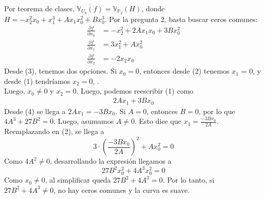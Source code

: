\begin{sol}
	Por teorema de clases, $\overline{\mathbb{V}_{U_0} (f)} = \mathbb{V}_{\mathbb{P}_2} (H)$, donde $H = -x_2^2x_0 + x_1^3 + Ax_1x_0^2 + Bx_0^3$. Por la pregunta 2, basta buscar ceros comunes: \begin{align}
		\frac{\partial f}{\partial x_0} & = -x_2^2 + 2Ax_1x_0 + 3Bx_0^2 \\
		\frac{\partial f}{\partial x_1} & = 3x_1^2 + Ax_0^2             \\
		\frac{\partial f}{\partial x_2} & = -2x_2x_0
	\end{align}
	Desde (3), tenemos dos opciones. Si $x_0 = 0$, entonces desde (2) tenemos $x_1$ = 0, y desde (1) tendríamos $x_2 = 0$, \nope. \\
	Luego, $x_0 \not= 0$ y $x_2 = 0$. Luego, podemos reescribir (1) como \begin{align}
		2Ax_1 + 3Bx_0
	\end{align}
	Desde (4) se llega a $2Ax_1 = -3Bx_0$. Si $A = 0$, entonces $B = 0$, por lo que $4A^3 + 27B^2 = 0$. Luego, asumamos $A \not= 0$. Esto dice que $x_1 = \frac{-3Bx_0}{2A}$. Reemplazando en (2), se llega a
	$$3 \cdot \left( \frac{-3Bx_0}{2A} \right)^2 + Ax_0^2 = 0$$
	Como $4A^2 \not= 0$, desarrollando la expresión llegamos a
	$$27B^2x_0^2 + 4A^3x_0^2 = 0$$
	Como $x_0 \not = 0$, al simplificar queda $27B^2 + 4A^3 = 0$. Por lo tanto, si $27B^2 + 4A^3 \not= 0$, no hay ceros comunes y la curva es suave.
\end{sol}

